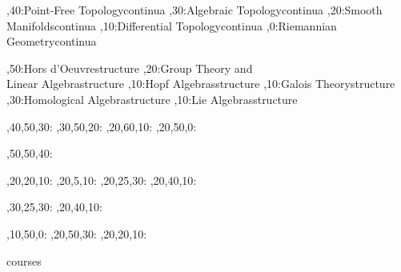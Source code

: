 \documentclass{article}
\begin{document}
	
	\begin{chart}%
		\begin{scope}[every rectangle node/.style={
				sharp corners,
				line width=0.6pt,
				fill=gray!15
			}]
			,40:{}{Point-Free Topology}{continua}
			,30:{}{Algebraic Topology}{continua}
			,20:{}{Smooth Manifolds}{continua}
			,10:{}{Differential Topology}{continua}		
			,0:{}{Riemannian Geometry}{continua}

			,50:{}{Hors d'Oeuvre}{structure}
			,20:{}{Group Theory and\\Linear Algebra}{structure}
			,10:{}{Hopf Algebras}{structure}		
			,10:{}{Galois Theory}{structure}
			,30:{}{Homological Algebra}{structure}
			,10:{}{Lie Algebras}{structure}
		\end{scope}
		
		,40,50,30:
		,30,50,20:
		,20,60,10:
		,20,50,0:
		
		,50,50,40:

		,20,20,10:
		,20,5,10:
		,20,25,30:
		,20,40,10:
		
		,30,25,30:
		,20,40,10:
		
		,10,50,0:
		,20,50,30:
		,20,20,10:
		
		\begin{pgfonlayer}{courses}
		\end{pgfonlayer}
	\end{chart}
	
\end{document}
